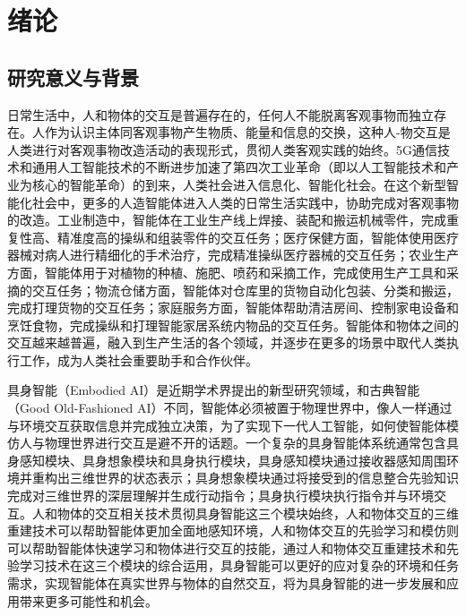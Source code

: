 \chapter{绪论}\label{chap:introduction}

\section{研究意义与背景}
日常生活中，人和物体的交互是普遍存在的，任何人不能脱离客观事物而独立存在。人作为认识主体同客观事物产生物质、能量和信息的交换，这种人-物交互是人类进行对客观事物改造活动的表现形式，贯彻人类客观实践的始终。5G通信技术和通用人工智能技术的不断进步加速了第四次工业革命（即以人工智能技术和产业为核心的智能革命）的到来，人类社会进入信息化、智能化社会。在这个新型智能化社会中，更多的人造智能体进入人类的日常生活实践中，协助完成对客观事物的改造。工业制造中，智能体在工业生产线上焊接、装配和搬运机械零件，完成重复性高、精准度高的操纵和组装零件的交互任务；医疗保健方面，智能体使用医疗器械对病人进行精细化的手术治疗，完成精准操纵医疗器械的交互任务；农业生产方面，智能体用于对植物的种植、施肥、喷药和采摘工作，完成使用生产工具和采摘的交互任务；物流仓储方面，智能体对仓库里的货物自动化包装、分类和搬运，完成打理货物的交互任务；家庭服务方面，智能体帮助清洁房间、控制家电设备和烹饪食物，完成操纵和打理智能家居系统内物品的交互任务。智能体和物体之间的交互越来越普遍，融入到生产生活的各个领域，并逐步在更多的场景中取代人类执行工作，成为人类社会重要助手和合作伙伴。

具身智能（Embodied AI）是近期学术界提出的新型研究领域，和古典智能（Good Old-Fashioned AI）不同，智能体必须被置于物理世界中，像人一样通过与环境交互获取信息并完成独立决策，为了实现下一代人工智能，如何使智能体模仿人与物理世界进行交互是避不开的话题。一个复杂的具身智能体系统通常包含具身感知模块、具身想象模块和具身执行模块，具身感知模块通过接收器感知周围环境并重构出三维世界的状态表示；具身想象模块通过将接受到的信息整合先验知识完成对三维世界的深层理解并生成行动指令；具身执行模块执行指令并与环境交互。人和物体的交互相关技术贯彻具身智能这三个模块始终，人和物体交互的三维重建技术可以帮助智能体更加全面地感知环境，人和物体交互的先验学习和模仿则可以帮助智能体快速学习和物体进行交互的技能，通过人和物体交互重建技术和先验学习技术在这三个模块的综合运用，具身智能可以更好的应对复杂的环境和任务需求，实现智能体在真实世界与物体的自然交互，将为具身智能的进一步发展和应用带来更多可能性和机会。

